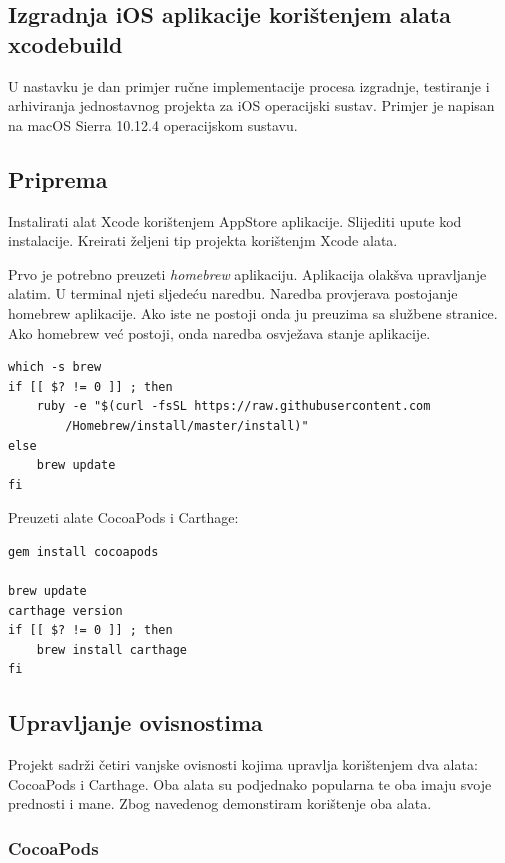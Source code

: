 \documentclass[times, utf8, diplomski, numeric]{fer}
\begin{document}
\begin{appendices}
\chapter{Izgradnja iOS aplikacije korištenjem alata xcodebuild}

U nastavku je dan primjer ručne implementacije procesa izgradnje, testiranje i arhiviranja jednostavnog projekta za iOS operacijski sustav. Primjer je napisan na macOS Sierra 10.12.4 operacijskom sustavu.

\section{Priprema}

Instalirati alat Xcode korištenjem AppStore aplikacije. Slijediti upute kod instalacije. Kreirati željeni tip projekta korištenjm Xcode alata.

Prvo je potrebno preuzeti \textit{homebrew} aplikaciju. Aplikacija olakšva upravljanje alatim. U terminal njeti sljedeću naredbu. Naredba provjerava postojanje homebrew aplikacije. Ako iste ne postoji onda ju preuzima sa službene stranice. Ako homebrew već postoji, onda naredba osvježava stanje aplikacije.
\begin{verbatim}
which -s brew
if [[ $? != 0 ]] ; then
    ruby -e "$(curl -fsSL https://raw.githubusercontent.com
        /Homebrew/install/master/install)"
else
    brew update
fi
\end{verbatim}

Preuzeti alate CocoaPods i Carthage:
\begin{verbatim}
gem install cocoapods

brew update
carthage version
if [[ $? != 0 ]] ; then
    brew install carthage
fi
\end{verbatim}


\section{Upravljanje ovisnostima}

Projekt sadrži četiri vanjske ovisnosti kojima upravlja korištenjem dva alata: CocoaPods i Carthage. Oba alata su podjednako popularna te oba imaju svoje prednosti i mane. Zbog navedenog demonstiram korištenje oba alata.

\subsection{CocoaPods}


\end{appendices}
\end{document}
